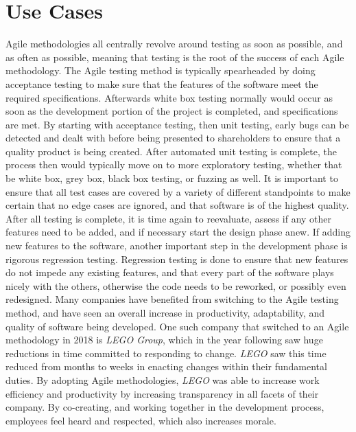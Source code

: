\documentclass[conference]{IEEEtran}
\begin{document}
\section{Use Cases}
Agile methodologies all centrally revolve around testing as soon as possible, and as often as possible, meaning that testing is the root of the success of each Agile methodology.  The Agile testing method is typically spearheaded by doing acceptance testing to make sure that the features of the software meet the required specifications. Afterwards white box testing normally would occur as soon as the development portion of the project is completed, and specifications are met.  By starting with acceptance testing, then unit testing, early bugs can be detected and dealt with before being presented to shareholders to ensure that a quality product is being created.  After automated unit testing is complete, the process then would typically move on to more exploratory testing, whether that be white box, grey box, black box testing, or fuzzing as well.  It is important to ensure that all test cases are covered by a variety of different standpoints to make certain that no edge cases are ignored, and that software is of the highest quality.  After all testing is complete, it is time again to reevaluate, assess if any other features need to be added, and if necessary start the design phase anew.  If adding new features to the software, another important step in the development phase is rigorous regression testing.  Regression testing is done to ensure that new features do not impede any existing features, and that every part of the software plays nicely with the others, otherwise the code needs to be reworked, or possibly even redesigned.\cite{REG}  Many companies have benefited from switching to the Agile testing method, and have seen an overall increase in productivity, adaptability, and quality of software being developed.  One such company that switched to an Agile methodology in 2018 is \textit{LEGO Group}, which in the year following saw huge reductions in time committed to responding to change.  \textit{LEGO} saw this time reduced from months to weeks in enacting changes within their fundamental duties.  By adopting Agile methodologies, \textit{LEGO} was able to increase work efficiency and productivity by increasing transparency in all facets of their company.\cite{LEGO}  By co-creating, and working together in the development process, employees feel heard and respected, which also increases morale.
\end{document}
